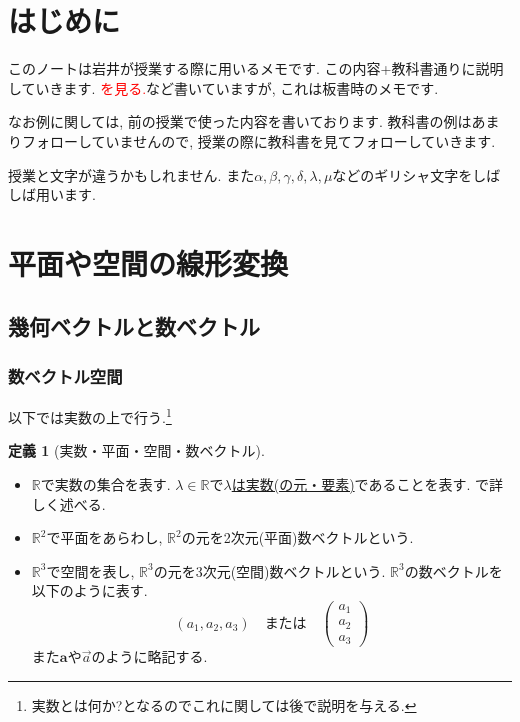 \documentclass[dvipdfmx,a4paper,11pt]{article} %
\newcommand{\R}{\mathbb{R}}
\newcommand{\xr}[1]{\textcolor{red}{#1}}
\theoremstyle{definition}
\newtheorem{dfn}[thm]{定義}
\begin{document}
 \setcounter{section}{-1}
\section{はじめに}
このノートは岩井が授業する際に用いるメモです. この内容+教科書通りに説明していきます. \xr{\cite[例 2.2.2]{O}を見る.}など書いていますが, これは板書時のメモです. 

なお例に関しては, 前の授業で使った内容を書いております. 教科書の例はあまりフォローしていませんので, 授業の際に教科書を見てフォローしていきます. 

授業と文字が違うかもしれません. また$\alpha, \beta, \gamma, \delta, \lambda, \mu$などのギリシャ文字をしばしば用います. 

\section{平面や空間の線形変換 \cite[1章]{O}}

\subsection{幾何ベクトルと数ベクトル \cite[1.1節]{O}} 

\subsubsection{数ベクトル空間}
以下\cite[1章]{O}では実数の上で行う.\footnote{実数とは何か?となるのでこれに関しては後で説明を与える.}

    \begin{dfn}[実数・平面・空間・数ベクトル]
    \text{}
    \begin{itemize}
      \setlength{\parskip}{0cm} 
  \setlength{\itemsep}{0cm}
    \item $\R$で実数の集合を表す. $\lambda \in \R$で\underline{$\lambda$は実数(の元・要素)}であることを表す. \cite[1.2節]{O}で詳しく述べる. 
    \item  $\R^2$で平面をあらわし, $\R^2$の元を2次元(平面)数ベクトルという.
    \item $\R^3$で空間を表し, $\R^3$の元を3次元(空間)数ベクトルという. $\R^3$の数ベクトルを以下のように表す. 
    $$
    (a_1, a_2, a_3)
    \quad
    \text{または}
    \quad
     \begin{pmatrix}
     a_1\\a_2\\a_3
      \end{pmatrix}
    $$
    また$\bm{a} $や$\overset{\to}{a}$のように略記する.
     \end{itemize}
         \end{dfn}
         
\end{document}
